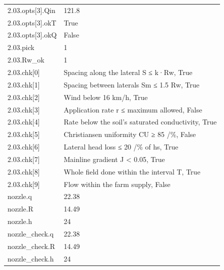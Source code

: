 {\begin{longtable}{p{}p{}}
{}2.03.opts[3].Qin & 121.8\\
{}2.03.opts[3].okT & True\\
{}2.03.opts[3].okQ & False\\
{}2.03.pick & 1\\
{}2.03.Rw\_ok & 1\\
{}2.03.chk[0] & Spacing along the lateral S ≤ k·Rw, True\\
{}2.03.chk[1] & Spacing between laterals Sm ≤ 1.5 Rw, True\\
{}2.03.chk[2] & Wind below 16 km/h, True\\
{}2.03.chk[3] & Application rate r ≤ maximum allowed, False\\
{}2.03.chk[4] & Rate below the soil’s saturated conductivity, True\\
{}2.03.chk[5] & Christiansen uniformity CU ≥ 85 /\%, False\\
{}2.03.chk[6] & Lateral head loss ≤ 20 /\% of hs, True\\
{}2.03.chk[7] & Mainline gradient J < 0.05, True\\
{}2.03.chk[8] & Whole field done within the interval T, True\\
{}2.03.chk[9] & Flow within the farm supply, False\\
{}nozzle.q & 22.38\\
{}nozzle.R & 14.49\\
{}nozzle.h & 24\\
{}nozzle\_check.q & 22.38\\
{}nozzle\_check.R & 14.49\\
{}nozzle\_check.h & 24\\
\bottomrule\end{longtable}}

